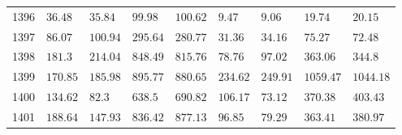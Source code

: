 \begin{tabular}{lllllllll}
    1396  & \(\mathrm{36.48}\)  & \(\mathrm{35.84}\)  & \(\mathrm{99.98}\)  & \(\mathrm{100.62}\) & \(\mathrm{9.47}\)   & \(\mathrm{9.06}\)   & \(\mathrm{19.74}\)   & \(\mathrm{20.15}\)   \\
    1397  & \(\mathrm{86.07}\)  & \(\mathrm{100.94}\) & \(\mathrm{295.64}\) & \(\mathrm{280.77}\) & \(\mathrm{31.36}\)  & \(\mathrm{34.16}\)  & \(\mathrm{75.27}\)   & \(\mathrm{72.48}\)   \\
    1398  & \(\mathrm{181.3}\)  & \(\mathrm{214.04}\) & \(\mathrm{848.49}\) & \(\mathrm{815.76}\) & \(\mathrm{78.76}\)  & \(\mathrm{97.02}\)  & \(\mathrm{363.06}\)  & \(\mathrm{344.8}\)   \\
    1399  & \(\mathrm{170.85}\) & \(\mathrm{185.98}\) & \(\mathrm{895.77}\) & \(\mathrm{880.65}\) & \(\mathrm{234.62}\) & \(\mathrm{249.91}\) & \(\mathrm{1059.47}\) & \(\mathrm{1044.18}\) \\
    1400  & \(\mathrm{134.62}\) & \(\mathrm{82.3}\)   & \(\mathrm{638.5}\)  & \(\mathrm{690.82}\) & \(\mathrm{106.17}\) & \(\mathrm{73.12}\)  & \(\mathrm{370.38}\)  & \(\mathrm{403.43}\)  \\
    1401  & \(\mathrm{188.64}\) & \(\mathrm{147.93}\) & \(\mathrm{836.42}\) & \(\mathrm{877.13}\) & \(\mathrm{96.85}\)  & \(\mathrm{79.29}\)  & \(\mathrm{363.41}\)  & \(\mathrm{380.97}\)  \\
    \bottomrule
\end{tabular}
